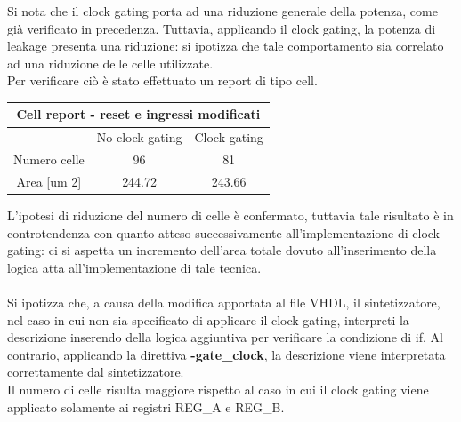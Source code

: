 \documentclass[11pt,  english, makeidx, a4paper, titlepage, oneside]{book}
\begin{document}
\vspace{0.3cm}          
Si nota che il clock gating porta ad una riduzione generale della potenza, come già verificato in precedenza. Tuttavia, applicando il clock gating, la potenza di leakage presenta una riduzione: si ipotizza che tale comportamento sia correlato ad una riduzione delle celle utilizzate.
\\
Per verificare ciò è stato effettuato un report di tipo cell.
\\
\begin{center}
	\begin{tabular}{|c|c|c|}
	\hline
	\multicolumn{3}{c}{Cell report - reset e ingressi modificati}\\
	\hline
	& No clock gating & Clock gating \\
	\hline
	Numero celle & 96 & 81 \\
	\hline
	 Area [um 2] & 244.72 & 243.66 \\
	\hline
	\end{tabular}	
\end{center}
\vspace{0.3cm} 
 L'ipotesi di riduzione del numero di celle è confermato, tuttavia tale risultato è in controtendenza con quanto atteso successivamente all'implementazione di clock gating: ci si aspetta un incremento dell'area totale dovuto all'inserimento della logica atta all'implementazione di tale tecnica.
 \\\\
Si ipotizza che, a causa della modifica apportata al file VHDL, il sintetizzatore, nel caso in cui non sia specificato di applicare il clock gating, interpreti la descrizione inserendo della logica aggiuntiva per verificare la condizione di if. Al contrario, applicando la direttiva \textbf{-gate\_clock}, la descrizione viene interpretata correttamente dal sintetizzatore.
\\
Il numero di celle risulta maggiore rispetto al caso in cui il clock gating viene applicato solamente ai registri REG\_A e REG\_B.
\end{document}
